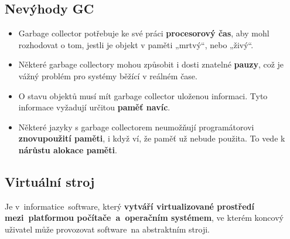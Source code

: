 \subsection{Nevýhody GC}
\begin{itemize}
\item Garbage collector potřebuje ke své práci \textbf{procesorový čas}, aby mohl rozhodovat o tom, jestli je objekt v paměti „mrtvý“, nebo „živý“.
\item Některé garbage collectory mohou způsobit i dosti znatelné \textbf{pauzy}, což je vážný problém pro systémy běžící v reálném čase.
\item O stavu objektů musí mít garbage collector uloženou informaci. Tyto informace vyžadují určitou \textbf{paměť navíc}.
\item Některé jazyky s garbage collectorem neumožňují programátorovi \textbf{znovupoužití paměti}, i když ví, že paměť už nebude použita. To vede k \textbf{nárůstu alokace paměti}.
\end{itemize}



\subsection{Virtuální stroj}
Je v informatice software, který \textbf{vytváří virtualizované prostředí mezi platformou počítače a operačním systémem}, ve kterém koncový uživatel může provozovat software na abstraktním stroji.


